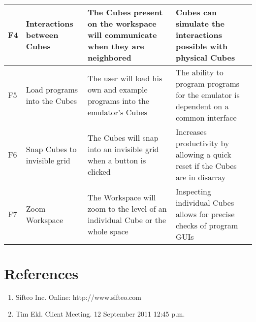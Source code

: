 \documentclass[12pt]{article}
\begin{document}
\begin{landscape}
\begin{table}[h]
\begin{tabular}{p{.5in} | p{2.25in} | p{2.75in} | p{3in}}
        F4 &
        Interactions between Cubes &
        The Cubes present on the workspace will communicate when they are neighbored &
        Cubes can simulate the interactions possible with physical Cubes
        \\ \hline

        F5 &
        Load programs into the Cubes &
        The user will load his own and example programs into the emulator’s\index{emulator} Cubes &
        The ability to program programs for the emulator\index{emulator} is dependent on a common interface
        \\ \hline

        F6 &
        Snap Cubes to invisible grid &
        The Cubes will snap into an invisible grid when a button is clicked &
        Increases productivity by allowing a quick reset if the Cubes are in disarray
        \\ \hline

        F7 &
        Zoom Workspace &
        The Workspace will zoom to the level of an individual Cube or the whole space &
        Inspecting individual Cubes allows for precise checks of program \glspl{GUI}\index{GUI}\glsadd{GUIa}
        \\ \hline

      \end{tabular}
    \end{table}
    \end{landscape}


\clearpage
{}
\printglossaries
\clearpage

\section*{References}

        \begin{enumerate}
                \item{Sifteo Inc. Online: http://www.sifteo.com}
                \item{Tim Ekl.  Client Meeting.  12 September 2011 12:45 p.m.}
        \end{enumerate}

\clearpage

\printindex
\end{document}
